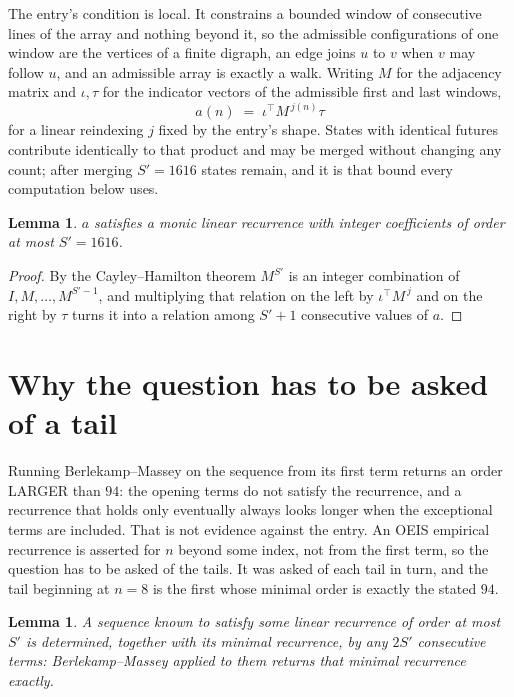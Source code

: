 \documentclass[11pt,a4paper]{article}
\theoremstyle{plain}
\newtheorem{lemma}[theorem]{Lemma}
\theoremstyle{definition}
\begin{document}
The entry's condition is local. It constrains a bounded window of consecutive lines of the
array and nothing beyond it, so the admissible configurations of one window are the vertices of
a finite digraph, an edge joins $u$ to $v$ when $v$ may follow $u$, and an admissible array is
exactly a walk. Writing $M$ for the adjacency matrix and $\iota,\tau$ for the indicator vectors
of the admissible first and last windows,
\[
a(n)\;=\;\iota^{\!\top}M^{\,j(n)}\tau
\]
for a linear reindexing $j$ fixed by the entry's shape. States with identical futures
contribute identically to that product and may be merged without changing any count; after
merging $S'=1616$ states remain, and it is that bound every computation below uses.

\begin{lemma}\label{lem:cf}
$a$ satisfies a monic linear recurrence with integer coefficients of order at most $S'=1616$.
\end{lemma}

\begin{proof}
By the Cayley--Hamilton theorem $M^{S'}$ is an integer combination of $I,M,\dots,M^{S'-1}$,
and multiplying that relation on the left by $\iota^{\!\top}M^{\,j}$ and on the right by
$\tau$ turns it into a relation among $S'+1$ consecutive values of $a$.
\end{proof}

\section{Why the question has to be asked of a tail}

Running Berlekamp--Massey on the sequence from its first term returns an order LARGER than $94$: the opening terms do not satisfy the recurrence, and a recurrence that holds only eventually always looks longer when the exceptional terms are included. That is not evidence against the entry. An OEIS empirical recurrence is asserted for $n$ beyond some index, not from the first term, so the question has to be asked of the tails. It was asked of each tail in turn, and the tail beginning at $n=8$ is the first whose minimal order is exactly the stated $94$.

\begin{lemma}\label{lem:bm}
A sequence known to satisfy some linear recurrence of order at most $S'$ is determined,
together with its minimal recurrence, by any $2S'$ consecutive terms: Berlekamp--Massey applied
to them returns that minimal recurrence exactly.
\end{lemma}
\end{document}
